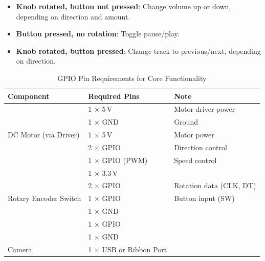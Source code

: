                \begin{itemize}
                    \item \textbf{Knob rotated, button not pressed}: Change volume up or down, depending on direction and amount.
                    \item \textbf{Button pressed, no rotation}: Toggle pause/play.
                    \item \textbf{Knob rotated, button pressed}: Change track to previous/next, depending on direction.
                \end{itemize}
    
                \begin{table}[htbp]
                    \centering
                    \caption{GPIO Pin Requirements for Core Functionality}
                    \label{tab:coreGPIOPins}
                    \begin{tabular}{|l|l|l|}
                        \hline
                        \textbf{Component} & \textbf{Required Pins} & \textbf{Note}\\ \hline
                        \multirow{5}{*}{DC Motor (via Driver)} & 1 × 5\,V & Motor driver power \\ \cline{2-3}
                                                               & 1 × GND & Ground \\ \cline{2-3}
                                                               & 1 × 5\,V & Motor power \\ \cline{2-3}
                                                               & 2 × GPIO & Direction control \\ \cline{2-3}
                                                               & 1 × GPIO (PWM) & Speed control \\ \hline
                        \multirow{5}{*}{Rotary Encoder Switch} & 1 × 3.3\,V & \\ \cline{2-3}
                                                               & 2 × GPIO& Rotation data (CLK, DT)\\ \cline{2-3}
                                                               & 1 × GPIO & Button input (SW)\\ \cline{2-3}
                                                               & 1 × GND & \\ \hline
                        \multirow{2}{*}{Button (Camera Trigger)} & 1 × GPIO & \\ \cline{2-3}
                                                                 & 1 × GND & \\ \hline
                        Camera & 1 × USB or Ribbon Port & \\ \hline
                    \end{tabular}
                \end{table}
    
